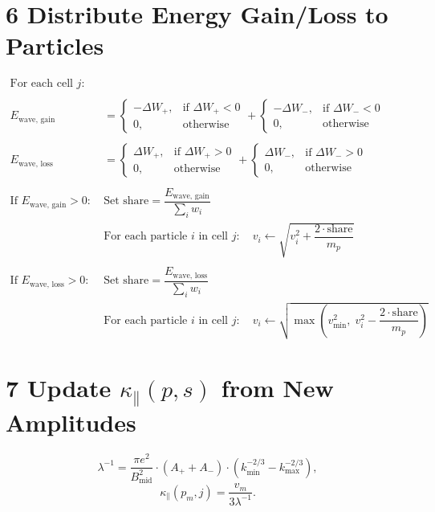 \section*{6 Distribute Energy Gain/Loss to Particles}
\begin{align*}
\text{For each cell } j: \\
\\
E_{\text{wave, gain}} &= 
\begin{cases}
- \Delta W_{+}, & \text{if } \Delta W_{+} < 0 \\
0, & \text{otherwise}
\end{cases}
+
\begin{cases}
- \Delta W_{-}, & \text{if } \Delta W_{-} < 0 \\
0, & \text{otherwise}
\end{cases} \\
\\
E_{\text{wave, loss}} &=
\begin{cases}
\Delta W_{+}, & \text{if } \Delta W_{+} > 0 \\
0, & \text{otherwise}
\end{cases}
+
\begin{cases}
\Delta W_{-}, & \text{if } \Delta W_{-} > 0 \\
0, & \text{otherwise}
\end{cases} \\
\\
\text{If } E_{\text{wave, gain}} > 0: \quad 
&\text{Set } \text{share} = \dfrac{E_{\text{wave, gain}}}{\sum_i w_i} \\
&\text{For each particle } i \text{ in cell } j: \quad
v_i \leftarrow \sqrt{v_i^2 + \dfrac{2 \cdot \text{share}}{m_p}} \\
\\
\text{If } E_{\text{wave, loss}} > 0: \quad 
&\text{Set } \text{share} = \dfrac{E_{\text{wave, loss}}}{\sum_i w_i} \\
&\text{For each particle } i \text{ in cell } j: \quad
v_i \leftarrow \sqrt{\max\left(v_{\min}^2,\; v_i^2 - \dfrac{2 \cdot \text{share}}{m_p} \right)}
\end{align*}


\section*{7 Update $\kappa_\parallel(p, s)$ from New Amplitudes}
\[
\lambda^{-1} = \frac{\pi e^2}{B_{\text{mid}}^2} \cdot (A_+ + A_-) \cdot \left(k_{\min}^{-2/3} - k_{\max}^{-2/3}\right),
\]
\[
\kappa_\parallel(p_m, j) = \frac{v_m}{3 \lambda^{-1}}.
\]


